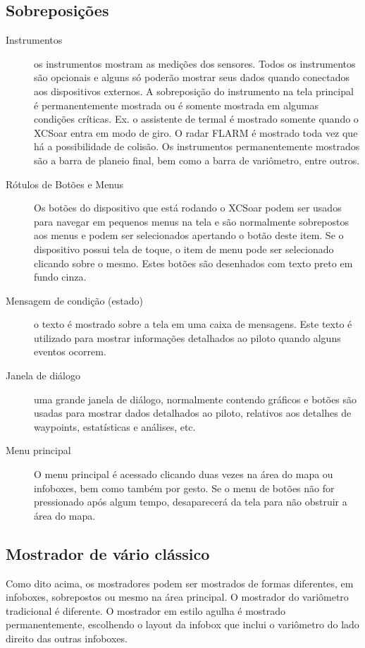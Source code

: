 \subsection*{Sobreposições}
\begin{description}
\item[Instrumentos]  os instrumentos mostram as medições dos sensores.  Todos os instrumentos são opcionais e alguns só poderão mostrar seus dados quando conectados aos dispositivos externos.  A sobreposição do instrumento na tela principal é permanentemente mostrada ou é somente mostrada em algumas condições críticas.  Ex. o assistente de termal é mostrado somente quando o XCSoar entra em modo de giro.  O radar FLARM é mostrado toda vez que há a possibilidade de colisão.  Os instrumentos permanentemente mostrados são a barra de planeio final, bem como a barra de variômetro, entre outros.

\item[Rótulos de Botões e Menus] Os botões do dispositivo que está rodando o XCSoar podem ser usados para navegar em pequenos menus na tela e são normalmente sobrepostos aos menus e podem ser selecionados apertando o botão deste item.  Se o dispositivo possui tela de toque, o item de menu pode ser selecionado clicando sobre o mesmo.  Estes botões são desenhados com texto preto em fundo cinza. 

\item[Mensagem de condição (estado)]o texto é mostrado sobre a tela em uma caixa de mensagens.  Este texto é utilizado para mostrar informações detalhados ao piloto quando alguns eventos ocorrem.

\item[Janela de diálogo] uma grande janela de diálogo, normalmente contendo gráficos e botões são usadas para mostrar dados detalhados ao piloto, relativos aos detalhes de waypoints, estatísticas e análises, etc.

\item[Menu principal] O menu principal é acessado clicando duas vezes na área do mapa ou infoboxes, bem como também por gesto.  Se o menu de botões não for pressionado após algum tempo, desaparecerá da tela para não obstruir a área do mapa. 
\end{description}

\subsection*{Mostrador de vário clássico}
Como dito acima, os mostradores podem ser mostrados de formas diferentes, em infoboxes, sobrepostos ou mesmo na área principal.  O mostrador do variômetro tradicional é diferente.  O mostrador em estilo agulha é mostrado permanentemente, escolhendo o layout da infobox que inclui o variômetro do lado direito das outras infoboxes.

